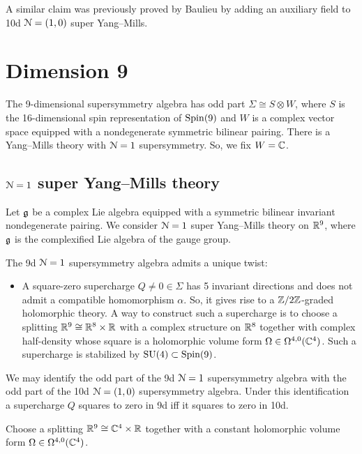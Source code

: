 \documentclass[10pt, oneside]{article}
\begin{document}
\begin{remark}
A similar claim was previously proved by Baulieu \cite{Baulieu} by adding an auxiliary field to 10d $\mathcal{N}=(1, 0)$ super Yang--Mills.
\end{remark}

\section{Dimension 9}

The 9-dimensional supersymmetry algebra has odd part $\Sigma\cong S\otimes W$, where $S$ is the 16-dimensional spin representation of $\mathrm{Spin}(9)$ and $W$ is a complex vector space equipped with a nondegenerate symmetric bilinear pairing. There is a Yang--Mills theory with $\mathcal{N}=1$ supersymmetry. So, we fix $W = \mathbb C$.

\subsection{\texorpdfstring{$\mathcal N=1$}{N=1} super Yang--Mills theory}

Let $\mathfrak g$ be a complex Lie algebra equipped with a symmetric bilinear invariant nondegenerate pairing. We consider $\mathcal N=1$ super Yang--Mills theory on $\mathbb R^9$, where $\mathfrak g$ is the complexified Lie algebra of the gauge group.

The 9d $\mathcal N=1$ supersymmetry algebra admits a unique twist:
\begin{itemize}
\item A square-zero supercharge $Q\neq 0\in\Sigma$ has 5 invariant directions and does not admit a compatible homomorphism $\alpha$. So, it gives rise to a $\mathbb Z/2\mathbb Z$-graded holomorphic theory. A way to construct such a supercharge is to choose a splitting $\mathbb R^9\cong \mathbb R^8\times \mathbb R$ with a complex structure on $\mathbb R^8$ together with complex half-density whose square is a holomorphic volume form $\Omega\in\Omega^{4, 0}(\mathbb C^4)$. Such a supercharge is stabilized by $\mathrm{SU}(4)\subset \mathrm{Spin}(9)$.
\end{itemize}

We may identify the odd part of the 9d $\mathcal{N}=1$ supersymmetry algebra with the odd part of the 10d $\mathcal{N}=(1, 0)$ supersymmetry algebra. Under this identification a supercharge $Q$ squares to zero in 9d iff it squares to zero in 10d.

Choose a splitting $\mathbb R^9\cong\mathbb C^4\times \mathbb R$ together with a constant holomorphic volume form $\Omega\in\Omega^{4, 0}(\mathbb C^4)$.
\end{document}

